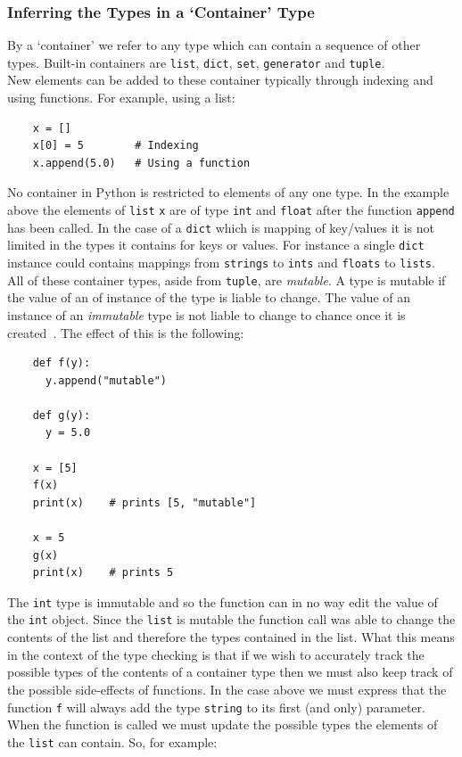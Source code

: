 \documentclass[12pt, titlepage]{article}
\begin{document}
\subsubsection{Inferring the Types in a `Container' Type}
\label{chap:inferringContainers}
By a `container' we refer to any type which can contain a sequence of other types. Built-in containers are \texttt{list}, \texttt{dict}, \texttt{set}, \texttt{generator} and \texttt{tuple}. \\
\indent New elements can be added to these container typically through indexing and using functions. For example, using a list:
\begin{lstlisting}
    x = []
    x[0] = 5        # Indexing
    x.append(5.0)   # Using a function
\end{lstlisting}
No container in Python is restricted to elements of any one type. In the example above the elements of \texttt{list} \texttt{x} are of type \texttt{int} and \texttt{float} after the function \texttt{append} has been called. In the case of a \texttt{dict} which is mapping of key/values it is not limited in the types it contains for keys or values. For instance a single \texttt{dict} instance could contains mappings from \texttt{strings} to \texttt{ints} and \texttt{floats} to \texttt{lists}. \\
\indent All of these container types, aside from \texttt{tuple}, are \textit{mutable}. A type is mutable if the value of an of instance of the type is liable to change. The value of an instance of an \textit{immutable} type is not liable to change to chance once it is created~\cite{pythonMutable}. The effect of this is the following:
\begin{lstlisting}
    def f(y):
      y.append("mutable")
     
    def g(y):
      y = 5.0
      
    x = [5]
    f(x)
    print(x)    # prints [5, "mutable"]
    
    x = 5
    g(x)
    print(x)    # prints 5
\end{lstlisting}
The \texttt{int} type is immutable and so the function can in no way edit the value of the \texttt{int} object. Since the \texttt{list} is mutable the function call was able to change the contents of the list and therefore the types contained in the list. What this means in the context of the type checking is that if we wish to accurately track the possible types of the contents of a container type then we must also keep track of the possible side-effects of functions. In the case above we must express that the function \texttt{f} will always add the type \texttt{string} to its first (and only) parameter. When the function is called we must update the possible types the elements of the \texttt{list} can contain. So, for example:
\end{document}
